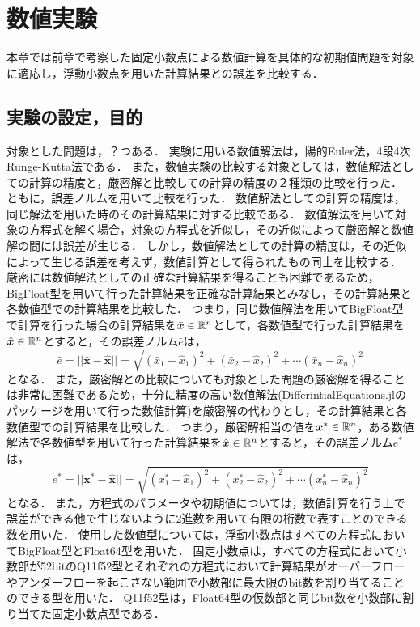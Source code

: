 \chapter{数値実験}
\label{chap:数値実験}
本章では前章で考察した固定小数点による数値計算を具体的な初期値問題を対象に適応し，浮動小数点を用いた計算結果との誤差を比較する．
\section{実験の設定，目的}
対象とした問題は，？つある．
実験に用いる数値解法は，陽的Euler法，4段4次Runge-Kutta法である．
また，数値実験の比較する対象としては，数値解法としての計算の精度と，厳密解と比較しての計算の精度の２種類の比較を行った．
ともに，誤差ノルムを用いて比較を行った．
数値解法としての計算の精度は，同じ解法を用いた時のその計算結果に対する比較である．
数値解法を用いて対象の方程式を解く場合，対象の方程式を近似し，その近似によって厳密解と数値解の間には誤差が生じる．
しかし，数値解法としての計算の精度は，その近似によって生じる誤差を考えず，数値計算として得られたもの同士を比較する．
厳密には数値解法としての正確な計算結果を得ることも困難であるため，BigFloat型を用いて行った計算結果を正確な計算結果とみなし，その計算結果と各数値型での計算結果を比較した．
つまり，同じ数値解法を用いてBigFloat型で計算を行った場合の計算結果を$\bar{\bm{x}} \in \mathbb{R}^n$として，各数値型で行った計算結果を$\hat{\bm{x}} \in \mathbb{R}^n$とすると，その誤差ノルム$\bar{e}$は，
\begin{equation}
    \bar{e} = ||\bar{\bm{x}} - \hat{\bm{x}}|| = \sqrt{(\bar{x}_1 - \hat{x}_1)^2 + (\bar{x}_2 - \hat{x}_2)^2 + \cdots (\bar{x}_n - \hat{x}_n)^2}
\end{equation}
となる．
また，厳密解との比較についても対象とした問題の厳密解を得ることは非常に困難であるため，十分に精度の高い数値解法(DifferintialEquations.jlのパッケージを用いて行った数値計算)を厳密解の代わりとし，その計算結果と各数値型での計算結果を比較した．
つまり，厳密解相当の値を$\bm{x}^{\ast} \in \mathbb{R}^n$，ある数値解法で各数値型を用いて行った計算結果を$\hat{\bm{x}} \in \mathbb{R}^n$とすると，その誤差ノルム$e^{\ast}$は，
\begin{equation}
   e^{\ast} = ||\bm{x}^{\ast} - \hat{\bm{x}}|| = \sqrt{(x_1^{\ast} - \hat{x}_1)^2 + (x_2^{\ast} - \hat{x}_2)^2 + \cdots (x_n^{\ast} - \hat{x}_n)^2}
\end{equation}
となる．
また，方程式のパラメータや初期値については，数値計算を行う上で誤差ができる他で生じないように2進数を用いて有限の桁数で表すことのできる数を用いた．
使用した数値型については，浮動小数点はすべての方程式においてBigFloat型とFloat64型を用いた．
固定小数点は，すべての方程式において小数部が52bitのQ11f52型とそれぞれの方程式において計算結果がオーバーフローやアンダーフローを起こさない範囲で小数部に最大限のbit数を割り当てることのできる型を用いた．
Q11f52型は，Float64型の仮数部と同じbit数を小数部に割り当てた固定小数点型である．
